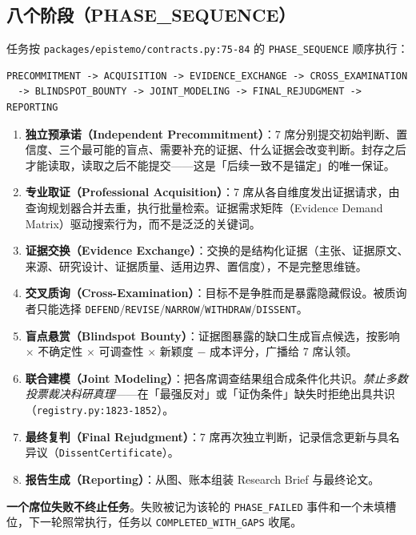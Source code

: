 \subsection{八个阶段（PHASE\_SEQUENCE）}

任务按 \texttt{packages/epistemo/contracts.py:75-84} 的 \texttt{PHASE\_SEQUENCE} 顺序执行：

\begin{lstlisting}
PRECOMMITMENT -> ACQUISITION -> EVIDENCE_EXCHANGE -> CROSS_EXAMINATION
  -> BLINDSPOT_BOUNTY -> JOINT_MODELING -> FINAL_REJUDGMENT -> REPORTING
\end{lstlisting}

\begin{enumerate}
\item \textbf{独立预承诺（Independent Precommitment）}：7 席分别提交初始判断、置信度、三个最可能的盲点、需要补充的证据、什么证据会改变判断。封存之后才能读取，读取之后不能提交——这是「后续一致不是锚定」的唯一保证。
\item \textbf{专业取证（Professional Acquisition）}：7 席从各自维度发出证据请求，由查询规划器合并去重，执行批量检索。证据需求矩阵（Evidence Demand Matrix）驱动搜索行为，而不是泛泛的关键词。
\item \textbf{证据交换（Evidence Exchange）}：交换的是结构化证据（主张、证据原文、来源、研究设计、证据质量、适用边界、置信度），不是完整思维链。
\item \textbf{交叉质询（Cross-Examination）}：目标不是争胜而是暴露隐藏假设。被质询者只能选择 \texttt{DEFEND}/\texttt{REVISE}/\texttt{NARROW}/\texttt{WITHDRAW}/\texttt{DISSENT}。
\item \textbf{盲点悬赏（Blindspot Bounty）}：证据图暴露的缺口生成盲点候选，按影响 $\times$ 不确定性 $\times$ 可调查性 $\times$ 新颖度 $-$ 成本评分，广播给 7 席认领。
\item \textbf{联合建模（Joint Modeling）}：把各席调查结果组合成条件化共识。\emph{禁止多数投票裁决科研真理}——在「最强反对」或「证伪条件」缺失时拒绝出具共识（\texttt{registry.py:1823-1852}）。
\item \textbf{最终复判（Final Rejudgment）}：7 席再次独立判断，记录信念更新与具名异议（\texttt{DissentCertificate}）。
\item \textbf{报告生成（Reporting）}：从图、账本组装 Research Brief 与最终论文。
\end{enumerate}

\textbf{一个席位失败不终止任务}。失败被记为该轮的 \texttt{PHASE\_FAILED} 事件和一个未填槽位，下一轮照常执行，任务以 \texttt{COMPLETED\_WITH\_GAPS} 收尾。

